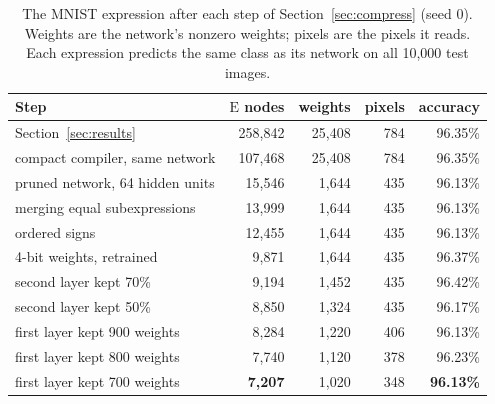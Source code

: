 \documentclass[11pt]{article}
\newcommand{\E}{\mathrm{E}}
\begin{document}
\begin{table}[tb]
\centering
\caption{The MNIST expression after each step of Section~\ref{sec:compress}
(seed 0). Weights are the network's nonzero weights; pixels are the pixels it
reads. Each expression predicts the same class as its network on all 10{,}000
test images.}
\label{tab:steps}
\small
\begin{tabular}{lrrrr}
\toprule
Step & $\E$ nodes & weights & pixels & accuracy \\
\midrule
Section~\ref{sec:results} & 258{,}842 & 25{,}408 & 784 & 96.35\% \\
compact compiler, same network & 107{,}468 & 25{,}408 & 784 & 96.35\% \\
pruned network, 64 hidden units & 15{,}546 & 1{,}644 & 435 & 96.13\% \\
merging equal subexpressions & 13{,}999 & 1{,}644 & 435 & 96.13\% \\
ordered signs & 12{,}455 & 1{,}644 & 435 & 96.13\% \\
4-bit weights, retrained & 9{,}871 & 1{,}644 & 435 & 96.37\% \\
second layer kept 70\% & 9{,}194 & 1{,}452 & 435 & 96.42\% \\
second layer kept 50\% & 8{,}850 & 1{,}324 & 435 & 96.17\% \\
first layer kept 900 weights & 8{,}284 & 1{,}220 & 406 & 96.13\% \\
first layer kept 800 weights & 7{,}740 & 1{,}120 & 378 & 96.23\% \\
first layer kept 700 weights & \textbf{7{,}207} & 1{,}020 & 348 & \textbf{96.13\%} \\
\bottomrule
\end{tabular}
\end{table}
\end{document}
